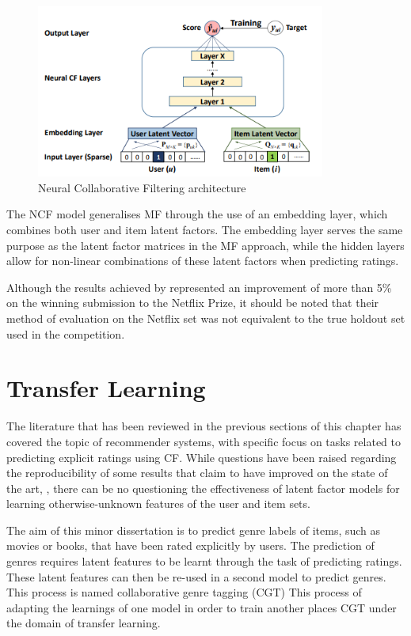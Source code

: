 \begin{figure}[H]
\centering
\includegraphics[width=9.5cm]{Figures/2_neural-cf.png}
\decoRule
\caption[Neural Collaborative Filtering]{Neural Collaborative Filtering architecture \parencite{he2017neural}}
\label{fig:ncf-arch}
\end{figure}

The NCF model generalises MF through the use of an embedding layer, which combines both user and item latent factors. The embedding layer serves the same purpose as the latent factor matrices in the MF approach, while the hidden layers allow for non-linear combinations of these latent factors when predicting ratings.

Although the results achieved by \citeauthor{sedhain2015autorec} represented an improvement of more than 5\% on the winning submission to the Netflix Prize, it should be noted that their method of evaluation on the Netflix set was not equivalent to the true holdout set used in the competition.

\section{Transfer Learning}
The literature that has been reviewed in the previous sections of this chapter has covered the topic of recommender systems, with specific focus on tasks related to predicting explicit ratings using CF. While questions have been raised regarding the reproducibility of some results that claim to have improved on the state of the art, \parencite{dacrema2019we}, there can be no questioning the effectiveness of latent factor models for learning otherwise-unknown features of the user and item sets.

The aim of this minor dissertation is to predict genre labels of items, such as movies or books, that have been rated explicitly by users. The prediction of genres requires latent features to be learnt through the task of predicting ratings. These latent features can then be re-used in a second model to predict genres. This process is named collaborative genre tagging (CGT) This process of adapting the learnings of one model in order to train another places CGT under the domain of transfer learning.

